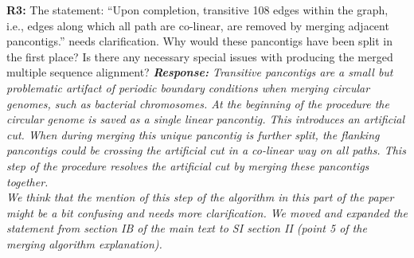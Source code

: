 \documentclass[aps,rmp,onecolumn]{revtex4-1}
\newcommand{\Marco}[1]{{\color{orange}Marco: #1}}
\newcommand{\Liam}[1]{{\color{teal}Liam: #1}}
\newcommand{\reviewer}[2]{\textbf{#1:} #2\vskip 5mm}
\newcommand{\response}[1]{{\it {\color{response}\textbf{Response:} #1}}\vskip 5mm}
\newcommand{\SIalgo}{II}
\begin{document}
\reviewer{R3}{The statement: ``Upon completion, transitive 108 edges within the graph, i.e., edges along which all path are co-linear, are removed by merging adjacent pancontigs.'' needs clarification. Why would these pancontigs have been split in the first place? Is there any necessary special issues with producing the merged multiple sequence alignment?}
\response{Transitive pancontigs are a small but problematic artifact of periodic boundary conditions when merging circular genomes, such as bacterial chromosomes. At the beginning of the procedure the circular genome is saved as a single linear pancontig. This introduces an artificial cut. When during merging this unique pancontig is further split, the flanking pancontigs could be crossing the artificial cut in a co-linear way on all paths. This step of the procedure resolves the artificial cut by merging these pancontigs together.\\
      We think that the mention of this step of the algorithm in this part of the paper might be a bit confusing and needs more clarification. We moved and expanded the statement from section IB of the main text to SI section {\SIalgo} (point 5 of the merging algorithm explanation).}
\end{document}

